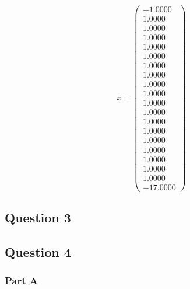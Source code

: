 \begin{equation}
  x = 
  \begin{pmatrix}
    -1.0000 \\
    1.0000 \\
    1.0000 \\    
    1.0000 \\
    1.0000 \\
    1.0000 \\
    1.0000 \\
    1.0000 \\
    1.0000 \\
    1.0000 \\
    1.0000 \\
    1.0000 \\
    1.0000 \\
    1.0000 \\    
    1.0000 \\
    1.0000 \\
    1.0000 \\ 
    1.0000 \\
    1.0000 \\
    -17.0000 
  \end{pmatrix}
\end{equation}

\newpage
\subsection{Question 3}




\newpage
\subsection{Question 4}



\newpage
\subsubsection{Part A}

